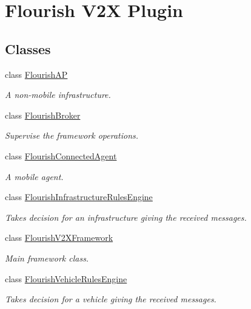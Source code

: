 \hypertarget{group__FlourishV2X}{}\section{Flourish V2X Plugin}
\label{group__FlourishV2X}
\subsection*{Classes}
\begin{DoxyCompactItemize}
\item 
class \hyperlink{classFlourishAP}{Flourish\+AP}
\begin{DoxyCompactList}\small\item\em A non-\/mobile infrastructure. \end{DoxyCompactList}\item 
class \hyperlink{classFlourishBroker}{Flourish\+Broker}
\begin{DoxyCompactList}\small\item\em Supervise the framework operations. \end{DoxyCompactList}\item 
class \hyperlink{classFlourishConnectedAgent}{Flourish\+Connected\+Agent}
\begin{DoxyCompactList}\small\item\em A mobile agent. \end{DoxyCompactList}\item 
class \hyperlink{classFlourishInfrastructureRulesEngine}{Flourish\+Infrastructure\+Rules\+Engine}
\begin{DoxyCompactList}\small\item\em Takes decision for an infrastructure giving the received messages. \end{DoxyCompactList}\item 
class \hyperlink{classFlourishV2XFramework}{Flourish\+V2\+X\+Framework}
\begin{DoxyCompactList}\small\item\em Main framework class. \end{DoxyCompactList}\item 
class \hyperlink{classFlourishVehicleRulesEngine}{Flourish\+Vehicle\+Rules\+Engine}
\begin{DoxyCompactList}\small\item\em Takes decision for a vehicle giving the received messages. \end{DoxyCompactList}\end{DoxyCompactItemize}


